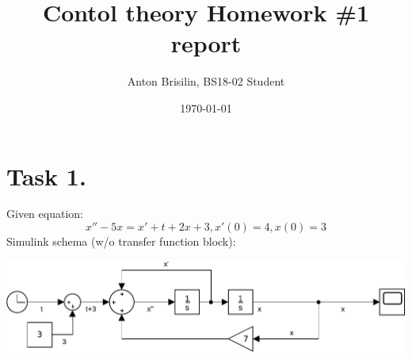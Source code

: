\documentclass[a4paper,12pt]{article}
\title{Contol theory Homework \#1 report}
\author{Anton Brisilin, BS18-02 Student}
\date{\today}
\begin{document}
\maketitle
\section{Task 1.}
Given equation:
$$x''-5x=x'+t+2x+3, x'(0)=4, x(0)=3$$
Simulink schema (w/o transfer function block):
\begin{center}
    \includegraphics[width=\linewidth]{Schema1.pdf}
\end{center}
\end{document}
